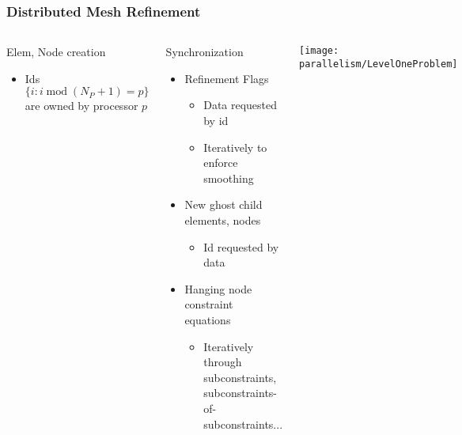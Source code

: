 \begin{frame}
\frametitle{Distributed Mesh Refinement}

\begin{columns}
\begin{block}{Elem, Node creation}
\begin{itemize}
\item Ids $\{i: i\;{\mathrm{mod}}\;(N_P+1) = p\}$ are owned by processor $p$
\end{itemize}
\end{block}

\begin{block}{Synchronization}
\begin{itemize}
\item Refinement Flags
\begin{itemize}
  \item Data requested by id
  \item Iteratively to enforce smoothing
\end{itemize}
\item New ghost child elements, nodes
\begin{itemize}
\item Id requested by data
\end{itemize}
\item Hanging node constraint equations
\begin{itemize}
\item Iteratively through subconstraints,
subconstraints-of-subconstraints...
\end{itemize}
\end{itemize}
\end{block}

\begin{center}
\texttt{[image: parallelism/LevelOneProblem]}
\end{center}
\end{columns}

\end{frame}


